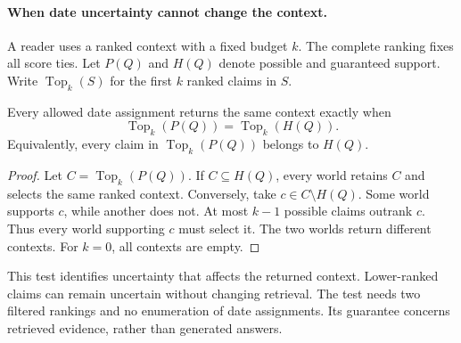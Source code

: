 \paragraph{When date uncertainty cannot change the context.}
A reader uses a ranked context with a fixed budget $k$.
The complete ranking fixes all score ties.
Let $P(Q)$ and $H(Q)$ denote possible and guaranteed support.
Write $\operatorname{Top}_k(S)$ for the first $k$ ranked claims in $S$.

\begin{theorem}
\label{thm:context-stability}
Every allowed date assignment returns the same context exactly when
\begin{equation}
 \operatorname{Top}_k(P(Q))=\operatorname{Top}_k(H(Q)).
\label{eq:context-stability}
\end{equation}
Equivalently, every claim in $\operatorname{Top}_k(P(Q))$ belongs to $H(Q)$.
\end{theorem}
\begin{proof}
Let $C=\operatorname{Top}_k(P(Q))$.
If $C\subseteq H(Q)$, every world retains $C$ and selects the same ranked context.
Conversely, take $c\in C\setminus H(Q)$.
Some world supports $c$, while another does not.
At most $k-1$ possible claims outrank $c$.
Thus every world supporting $c$ must select it.
The two worlds return different contexts.
For $k=0$, all contexts are empty.
\end{proof}

This test identifies uncertainty that affects the returned context.
Lower-ranked claims can remain uncertain without changing retrieval.
The test needs two filtered rankings and no enumeration of date assignments.
Its guarantee concerns retrieved evidence, rather than generated answers.
